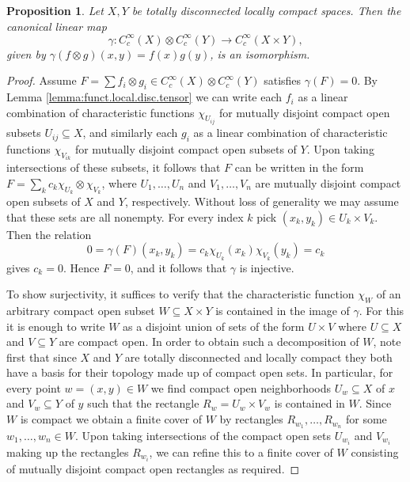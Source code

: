 \documentclass{amsart}
\newtheorem{prop}[thm]{Proposition}
\newcommand{\ccinfty}{C_c^\infty}
\begin{document}
\begin{prop} \label{Lemma:cartesian loc. const. function}
Let $ X, Y $ be totally disconnected locally compact spaces. Then the canonical linear map 
$$ 
\gamma: \ccinfty(X) \otimes \ccinfty(Y) \rightarrow \ccinfty(X \times Y), 
$$ 
given by $ \gamma(f \otimes g)(x,y) = f(x) g(y) $, is an isomorphism. 
\end{prop}

\begin{proof}
Assume $ F = \sum f_i \otimes g_i \in \ccinfty(X) \otimes \ccinfty(Y) $ satisfies $ \gamma(F) = 0 $. By Lemma \ref{lemma:funct.local.disc.tensor} we can write each $ f_i $ as a linear combination of characteristic functions $ \chi_{U_{ij}} $ for mutually disjoint compact open subsets $ U_{ij} \subseteq X $, and similarly each $ g_i $ as a linear combination of characteristic functions $ \chi_{V_{ik}} $ for mutually disjoint compact open subsets of $ Y $. Upon taking intersections of these subsets, it follows that $ F $ can be written in the form $ F = \sum_k c_k \chi_{U_k} \otimes \chi_{V_k} $, where $ U_1, \dots, U_n $ and $ V_1, \dots, V_n $ are mutually disjoint compact open subsets of $ X $ and $ Y $, respectively. Without loss of generality we may assume that these sets are all nonempty. For every index $ k $ pick $ (x_k,y_k) \in U_k \times V_k $. Then the relation
$$ 
0 = \gamma(F)(x_k,y_k) = c_k \chi_{U_k}(x_k)\chi_{V_k}(y_k) = c_k 
$$ 
gives $ c_k = 0 $. Hence $ F = 0 $, and it follows that $ \gamma $ is injective. 
    
To show surjectivity, it suffices to verify that the characteristic function $ \chi_W $ of an arbitrary compact open subset $ W \subseteq X \times Y $ is contained in the image of $ \gamma $. For this it is enough to write $ W $ as a disjoint union of sets of the form $ U \times V $ where $ U \subseteq X $ and $ V \subseteq Y $ are compact open. In order to obtain such a decomposition of $ W $, note first that since $ X $ and $ Y $ are totally disconnected and locally compact they both have a basis for their topology made up of compact open sets. 
In particular, for every point $ w = (x, y) \in W $ we find compact open neighborhoods $ U_w \subseteq X $ of $ x $ and $ V_w \subseteq Y $ of $ y $ such that the rectangle $ R_w = U_w \times V_w $ is contained in $ W $. Since $ W $ is compact we obtain a finite cover of $ W $ by rectangles $ R_{w_1}, \dots, R_{w_n} $ for some $ w_1, \dots, w_n \in W $. Upon taking intersections of the compact open sets $ U_{w_i} $ and $ V_{w_i} $ making up the rectangles $ R_{w_i} $, we can refine this to a finite cover of $ W $ consisting of mutually disjoint compact open rectangles as required. 
\end{proof}
\end{document}
